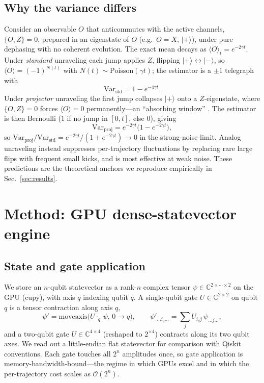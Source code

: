 \documentclass{ieeeaccess}
\newcommand{\ket}[1]{\lvert #1 \rangle}
\newcommand{\expv}[1]{\langle #1 \rangle}
\begin{document}
\subsection{Why the variance differs}
Consider an observable $O$ that anticommutes with the active channels, $\{O,Z\}=0$, prepared in
an eigenstate of $O$ (e.g.\ $O=X$, $\ket{+}$), under pure dephasing with no coherent evolution.
The exact mean decays as $\expv{O}_t=e^{-2\gamma t}$. Under \emph{standard} unraveling each jump
applies $Z$, flipping $\ket{+}\!\leftrightarrow\!\ket{-}$, so $\expv{O}=(-1)^{N(t)}$ with
$N(t)\sim\mathrm{Poisson}(\gamma t)$; the estimator is a $\pm1$ telegraph with
\begin{equation}
\mathrm{Var}_{\mathrm{std}} = 1-e^{-4\gamma t}.
\label{eq:varstd}
\end{equation}
Under \emph{projector} unraveling the first jump collapses $\ket{+}$ onto a $Z$-eigenstate, where
$\{O,Z\}=0$ forces $\expv{O}=0$ permanently---an ``absorbing window'' \cite{tjm2026}. The
estimator is then Bernoulli ($1$ if no jump in $[0,t]$, else $0$), giving
\begin{equation}
\mathrm{Var}_{\mathrm{proj}} = e^{-2\gamma t}\big(1-e^{-2\gamma t}\big),
\label{eq:varproj}
\end{equation}
so $\mathrm{Var}_{\mathrm{proj}}/\mathrm{Var}_{\mathrm{std}} = e^{-2\gamma t}/(1+e^{-2\gamma t}) \to 0$
in the strong-noise limit. Analog unraveling instead suppresses per-trajectory fluctuations by
replacing rare large flips with frequent small kicks, and is most effective at weak noise. These
predictions are the theoretical anchors we reproduce empirically in Sec.~\ref{sec:results}.

\section{Method: GPU dense-statevector engine}\label{sec:method}
\subsection{State and gate application}
We store an $n$-qubit statevector as a rank-$n$ complex tensor $\psi\in\mathbb{C}^{2\times\cdots\times2}$
on the GPU (cupy), with axis $q$ indexing qubit $q$. A single-qubit gate $U\in\mathbb{C}^{2\times2}$
on qubit $q$ is a tensor contraction along axis $q$,
\begin{equation}
\psi' = \mathrm{moveaxis}\big(U \cdot_{q}\, \psi,\, 0\!\to\! q\big),\qquad
\psi'_{\ldots i_q \ldots} = \sum_{j} U_{i_q j}\,\psi_{\ldots j \ldots},
\end{equation}
and a two-qubit gate $U\in\mathbb{C}^{4\times4}$ (reshaped to $2^{\times4}$) contracts along its
two qubit axes. We read out a little-endian flat statevector for comparison with Qiskit
conventions. Each gate touches all $2^n$ amplitudes once, so gate application is
memory-bandwidth-bound---the regime in which GPUs excel and in which the per-trajectory cost
scales as $\mathcal{O}(2^n)$.
\end{document}
